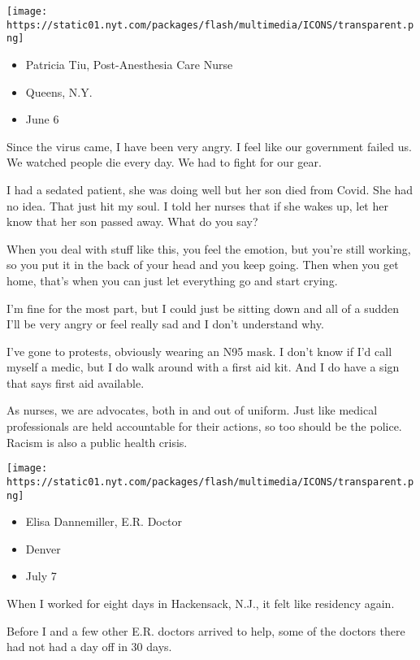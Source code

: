 \texttt{[image: https://static01.nyt.com/packages/flash/multimedia/ICONS/transparent.png]}

\begin{itemize}
\tightlist
\item
  Patricia Tiu, Post-Anesthesia Care Nurse
\item
  Queens, N.Y.
\item
  June 6
\end{itemize}

Since the virus came, I have been very angry. I feel like our government
failed us. We watched people die every day. We had to fight for our
gear.

I had a sedated patient, she was doing well but her son died from Covid.
She had no idea. That just hit my soul. I told her nurses that if she
wakes up, let her know that her son passed away. What do you say?

When you deal with stuff like this, you feel the emotion, but you're
still working, so you put it in the back of your head and you keep
going. Then when you get home, that's when you can just let everything
go and start crying.

I'm fine for the most part, but I could just be sitting down and all of
a sudden I'll be very angry or feel really sad and I don't understand
why.

I've gone to protests, obviously wearing an N95 mask. I don't know if
I'd call myself a medic, but I do walk around with a first aid kit. And
I do have a sign that says first aid available.

As nurses, we are advocates, both in and out of uniform. Just like
medical professionals are held accountable for their actions, so too
should be the police. Racism is also a public health crisis.

\texttt{[image: https://static01.nyt.com/packages/flash/multimedia/ICONS/transparent.png]}

\begin{itemize}
\tightlist
\item
  Elisa Dannemiller, E.R. Doctor
\item
  Denver
\item
  July 7
\end{itemize}

When I worked for eight days in Hackensack, N.J., it felt like residency
again.

Before I and a few other E.R. doctors arrived to help, some of the
doctors there had not had a day off in 30 days.

